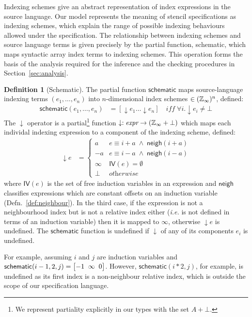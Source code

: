 \documentclass[9pt]{sigplanconf}
\newcounter{block}
\theoremstyle{definition}
\newtheorem{definition}[block]{Definition}
\newcommand{\ie}{\emph{i.e.}}
\newcommand{\neigh}{\textsf{neigh}}
\newcommand{\vthreeh}[3]{\setlength{\arraycolsep}{0em}
\left[\begin{array}{ccc}#1 \; & \; #2 \; & \; #3\end{array}\right]}
\begin{document}
Indexing schemes give an abstract
representation of index expressions in the source language.
Our model represents the meaning of stencil specifications
as indexing schemes, which explain the range of possible
indexing behaviours allowed under the specification.
The relationship between indexing schemes and source language
terms is given precisely by the partial function, \textsf{schematic}, which
maps syntactic array index terms to indexing schemes. This
operation forms the basis of the analysis required for the inference
and the checking procedures in Section~\ref{sec:analysis}. 

\begin{definition}[Schematic]
The partial function $\textsf{schematic}$ maps 
source-language indexing terms $(e_1, \ldots, e_n)$
into $n$-dimensional index schemes 
$\in (\mathbb{Z}_\infty)^n$, defined:
%
\begin{align*}
\mathsf{schematic}(e_1, \ldots, e_n) & = 
[\downarrow\!e_1 \ldots \downarrow\!e_n ] 
\quad \textit{iff} \; \forall i . \downarrow\!e_i \neq \bot 
\end{align*}
%
The $\downarrow$ operator is a partial\footnote{We represent
  partiality explicitly in our types with the set $A + \bot$.} function 
 $\downarrow : \textit{expr} \rightarrow (\mathbb{Z}_\infty + \bot)$
which maps each individal indexing expression to a component of
the indexing scheme, defined: 
\begin{align*}
\downarrow\!e
 & =  \begin{cases}
a & e \equiv i + a \; \wedge \; \mathsf{neigh}(i + a) \\
-a & e \equiv i - a \; \wedge \; \mathsf{neigh}(i - a) \\
\infty & \textit{$\mathsf{IV}(e) = \emptyset$} \\
\bot   & \textit{otherwise}
\end{cases}
\end{align*}
where $\mathsf{IV}(e)$ is the set of free induction variables
 in an expression and $\neigh{}$ classifies expressions which 
are constant offsets on an induction variable
(Defn.~\ref{def:neighbour}). In the third case, 
if the expression is not a neighbourhood index but is not
a relative index either (\ie{} is not defined in terms
of an induction variable) then it is mapped to $\infty$, otherwise
$\downarrow\!e$ is undefined. The $\mathsf{schematic}$ function
is undefined if $\downarrow$ of any of its components $e_i$ is
undefined. 

For example, assuming
$i$ and $j$ are induction variables and $\textsf{schematic}(i-1, 2, j)
 = \vthreeh{-1}{\infty}{0}$. However, $\textsf{schematic}(i*2, j)$, for
 example, is
 undefined as its first index is a non-neighbour relative index, which 
 is outside the scope of our specification language.
\end{definition}
\end{document}
